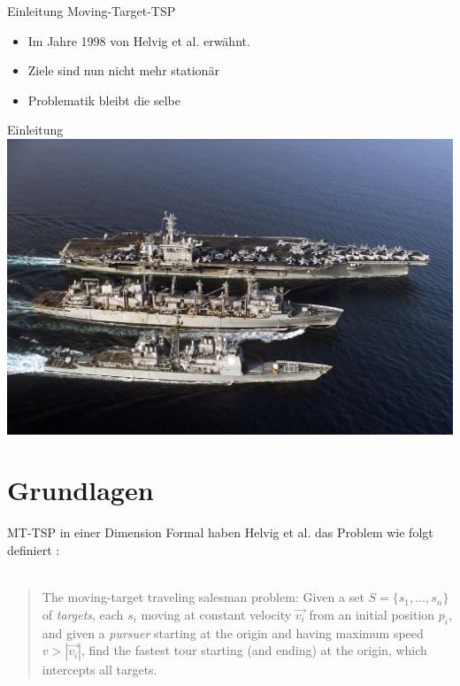 \documentclass[10pt,table]{beamer}
\begin{document}
\begin{frame}{Einleitung}
Moving-Target-TSP
\begin{itemize}
\item
Im Jahre 1998 von Helvig et al. erwähnt.
\item
Ziele sind nun nicht mehr stationär
\item
Problematik bleibt die selbe
\end{itemize}

\end{frame}

\begin{frame}{Einleitung}
\centering
\includegraphics[scale=0.8]{Images/Versorgungsschiff.jpg}
\end{frame}

\section{Grundlagen}
\begin{frame}{MT-TSP in einer Dimension}
Formal haben Helvig et al. das Problem wie folgt definiert \cite{helvig}:\\~\\
\begin{quote}
The moving-target traveling salesman problem: Given a set $S = \{s_1, \dots , s_n\}$ of \emph{targets}, each $s_i$ moving at constant velocity $\overrightarrow{v_i}$ from an initial position $p_i$, and given a \emph{pursuer} starting at the origin and having maximum speed $v>|\overrightarrow{v_i}|$, find the fastest tour starting (and ending) at the origin, which intercepts all targets.
\end{quote}
\end{frame}
\end{document}
